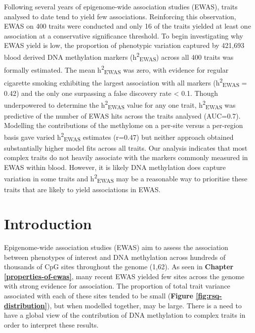 \documentclass[11pt,oneside]{bristolthesis}
\begin{document}
Following several years of epigenome-wide association studies (EWAS), traits analysed to date tend to yield few associations. Reinforcing this observation, EWAS on 400 traits were conducted and only 16 of the traits yielded at least one association at a conservative significance threshold. To begin investigating why EWAS yield is low, the proportion of phenotypic variation captured by 421,693 blood derived DNA methylation markers (h\textsuperscript{2}\textsubscript{EWAS}) across all 400 traits was formally estimated. The mean h\textsuperscript{2}\textsubscript{EWAS} was zero, with evidence for regular cigarette smoking exhibiting the largest association with all markers (h\textsuperscript{2}\textsubscript{EWAS} = 0.42) and the only one surpassing a false discovery rate \textless{} 0.1. Though underpowered to determine the h\textsuperscript{2}\textsubscript{EWAS} value for any one trait, h\textsuperscript{2}\textsubscript{EWAS} was predictive of the number of EWAS hits across the traits analysed (AUC=0.7). Modelling the contributions of the methylome on a per-site versus a per-region basis gave varied h\textsuperscript{2}\textsubscript{EWAS} estimates (r=0.47) but neither approach obtained substantially higher model fits across all traits. Our analysis indicates that most complex traits do not heavily associate with the markers commonly measured in EWAS within blood. However, it is likely DNA methylation does capture variation in some traits and h\textsuperscript{2}\textsubscript{EWAS} may be a reasonable way to prioritise these traits that are likely to yield associations in EWAS.

\hypertarget{introduction-05}{%
\section{Introduction}\label{introduction-05}}

Epigenome-wide association studies (EWAS) aim to assess the association between phenotypes of interest and DNA methylation across hundreds of thousands of CpG sites throughout the genome (1,62). As seen in \textbf{Chapter \ref{properties-of-ewas}}, many recent EWAS yielded few sites across the genome with strong evidence for association. The proportion of total trait variance associated with each of these sites tended to be small (\textbf{Figure \ref{fig:rsq-distribution}}), but when modelled together, may be large. There is a need to have a global view of the contribution of DNA methylation to complex traits in order to interpret these results.
\end{document}
